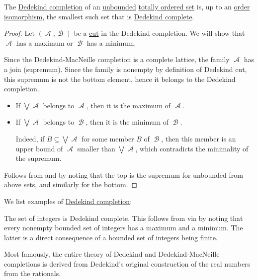 \begin{theorem}\label{thm:def:dedekind_completion}
  The \hyperref[def:dedekind_completion]{Dedekind completion} of an \hyperref[def:extremal_points/bounds]{unbounded} \hyperref[def:totally_ordered_set]{totally ordered set} is, up to an \hyperref[def:preordered_set/homomorphism]{order isomorphism}, the smallest such set that is \hyperref[def:dedekind_completeness]{Dedekind complete}.
\end{theorem}
\begin{proof}
   Let \( (\mscrA, \mscrB) \) be a \hyperref[def:dedekind_cut]{cut} in the Dedekind completion. We will show that \( \mscrA \) has a maximum or \( \mscrB \) has a minimum.

  Since the Dedekind-MacNeille completion is a complete lattice, the family \( \mscrA \) has a join (supremum). Since the family is nonempty by definition of Dedekind cut, this supremum is not the bottom element, hence it belongs to the Dedekind completion.
  \begin{itemize}
    \item If \( \bigvee \mscrA \) belongs to \( \mscrA \), then it is the maximum of \( \mscrA \).
    \item If \( \bigvee \mscrA \) belongs to \( \mscrB \), then it is the minimum of \( \mscrB \).

    Indeed, if \( B \subseteq \bigvee \mscrA \) for some member \( B \) of \( \mscrB \), then this member is an upper bound of \( \mscrA \) smaller than \( \bigvee \mscrA \), which contradicts the minimality of the supremum.
  \end{itemize}

   Follows from  and  by noting that the top is the supremum for unbounded from above sets, and similarly for the bottom.
\end{proof}

\begin{example}\label{ex:thm:def:dedekind_completion}
  We list examples of \hyperref[def:dedekind_completion]{Dedekind completion}:
  \begin{thmenum}
     The set of integers is Dedekind complete. This follows from  via  by noting that every nonempty bounded set of integers has a maximum and a minimum. The latter is a direct consequence of a bounded set of integers being finite.

     Most famously, the entire theory of Dedekind and Dedekind-MacNeille completions is derived from Dedekind's original construction of the real numbers from the rationals.
  \end{thmenum}
\end{example}

